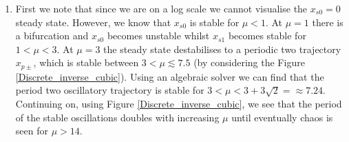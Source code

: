 \documentclass[10pt]{article}
\newcommand{\fig}[1]{Figure \ref{#1}}
\begin{document}
\begin{Answ}
\begin{enumerate}
\begin{enumerate}
\item First we note that since we are on a log scale we cannot visualise the $x_{s0}=0$ steady state. However, we know that $x_{s0}$ is stable for $\mu<1$. At $\mu=1$ there is a bifurcation and $x_{s0}$ becomes unstable whilst $x_{s1}$ becomes stable for $1<\mu<3$. At $\mu=3$ the steady state destabilises to a periodic two trajectory $x_{p\pm}$, which is stable between $3<\mu \lesssim 7.5$ (by considering the \fig{Discrete_inverse_cubic}). Using an algebraic solver we can find that the period two oscillatory trajectory is stable for $3<\mu<3+3\sqrt{2}=\approx 7.24$. Continuing on, using \fig{Discrete_inverse_cubic}, we see that the period of the stable oscillations doubles with increasing $\mu$ until eventually chaos is seen for $\mu>14$.
\end{enumerate}


\end{enumerate}
\end{Answ}
\end{document}
